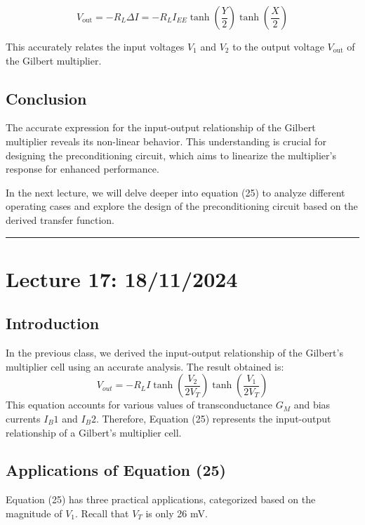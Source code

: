 \documentclass[a4paper,9pt,twoside,openany,twocolumn]{memoir}
\begin{document}
\begin{equation}
V_{\text{out}} = -R_L \Delta I = -R_L I_{EE} \tanh\left(\frac{Y}{2}\right) \tanh\left(\frac{X}{2}\right)
\end{equation}

This accurately relates the input voltages \( V_1 \) and \( V_2 \) to the output voltage \( V_{\text{out}} \) of the Gilbert multiplier.

\subsection{Conclusion}

The accurate expression for the input-output relationship of the Gilbert multiplier reveals its non-linear behavior. This understanding is crucial for designing the preconditioning circuit, which aims to linearize the multiplier's response for enhanced performance.

In the next lecture, we will delve deeper into equation (25) to analyze different operating cases and explore the design of the preconditioning circuit based on the derived transfer function.
\begin{center}\rule{0.5\linewidth}{0.5pt}\end{center}

\section*{Lecture 17: 18/11/2024}

\subsection{Introduction}
In the previous class, we derived the input-output relationship of the Gilbert's multiplier cell using an accurate analysis. The result obtained is:
\[
V_{out} = -R_L I \tanh\left(\frac{V_2}{2V_T}\right) \tanh\left(\frac{V_1}{2V_T}\right)
\]
This equation accounts for various values of transconductance \( G_M \) and bias currents \( I_B1 \) and \( I_B2 \). Therefore, Equation (25) represents the input-output relationship of a Gilbert's multiplier cell.

\subsection{Applications of Equation (25)}
Equation (25) has three practical applications, categorized based on the magnitude of \( V_1 \). Recall that \( V_T \) is only 26 mV.
\end{document}
